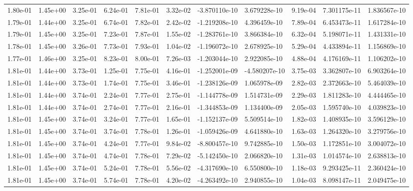 \begin{longtable}{| p{} | p{} |}
1.80e-01 & 1.45e+00 & 3.25e-01 & 6.24e-01 & 7.81e-01 & 3.32e-02 & -3.870110e-10 &  3.679228e-10 &  9.19e-04 &  7.301175e-11 &  1.836567e-10 \\
1.79e-01 & 1.44e+00 & 3.25e-01 & 6.74e-01 & 7.82e-01 & 2.42e-02 & -1.219208e-10 &  4.396459e-10 &  7.89e-04 &  6.453473e-11 &  1.617284e-10 \\
1.79e-01 & 1.45e+00 & 3.25e-01 & 7.23e-01 & 7.87e-01 & 1.55e-02 & -1.283761e-10 &  3.866384e-10 &  6.32e-04 &  5.198071e-11 &  1.431331e-10 \\
1.78e-01 & 1.45e+00 & 3.26e-01 & 7.73e-01 & 7.93e-01 & 1.04e-02 & -1.196072e-10 &  2.678925e-10 &  5.29e-04 &  4.433894e-11 &  1.156869e-10 \\
1.77e-01 & 1.46e+00 & 3.25e-01 & 8.23e-01 & 8.00e-01 & 7.26e-03 & -1.203044e-10 &  2.922085e-10 &  4.88e-04 &  4.176169e-11 &  1.106202e-10 \\
1.81e-01 & 1.44e+00 & 3.73e-01 & 1.25e-01 & 7.75e-01 & 4.16e-01 & -1.252001e-09 & -4.580207e-10 &  3.75e-03 &  3.362807e-10 &  6.903264e-10 \\
1.81e-01 & 1.44e+00 & 3.73e-01 & 1.74e-01 & 7.75e-01 & 3.46e-01 & -1.238126e-09 &  1.065978e-09 &  2.82e-03 &  2.372663e-10 &  5.464039e-10 \\
1.81e-01 & 1.44e+00 & 3.74e-01 & 2.24e-01 & 7.77e-01 & 2.75e-01 & -1.144778e-09 &  1.514731e-09 &  2.29e-03 &  1.811283e-10 &  4.444465e-10 \\
1.81e-01 & 1.44e+00 & 3.74e-01 & 2.74e-01 & 7.77e-01 & 2.16e-01 & -1.344853e-09 &  1.134400e-09 &  2.05e-03 &  1.595740e-10 &  4.039823e-10 \\
1.81e-01 & 1.45e+00 & 3.74e-01 & 3.24e-01 & 7.77e-01 & 1.65e-01 & -1.152137e-09 &  5.509514e-10 &  1.82e-03 &  1.408935e-10 &  3.596129e-10 \\
1.81e-01 & 1.45e+00 & 3.74e-01 & 3.74e-01 & 7.78e-01 & 1.26e-01 & -1.059426e-09 &  4.641880e-10 &  1.63e-03 &  1.264320e-10 &  3.279756e-10 \\
1.81e-01 & 1.45e+00 & 3.74e-01 & 4.24e-01 & 7.77e-01 & 9.84e-02 & -8.800457e-10 &  9.742885e-10 &  1.50e-03 &  1.172851e-10 &  3.004072e-10 \\
1.81e-01 & 1.45e+00 & 3.74e-01 & 4.74e-01 & 7.78e-01 & 7.29e-02 & -5.142450e-10 &  2.066820e-10 &  1.31e-03 &  1.014574e-10 &  2.638813e-10 \\
1.81e-01 & 1.45e+00 & 3.74e-01 & 5.24e-01 & 7.78e-01 & 5.56e-02 & -4.317690e-10 &  6.550800e-10 &  1.18e-03 &  9.293425e-11 &  2.360424e-10 \\
1.81e-01 & 1.45e+00 & 3.74e-01 & 5.74e-01 & 7.78e-01 & 4.20e-02 & -4.263492e-10 &  2.940855e-10 &  1.04e-03 &  8.098147e-11 &  2.049475e-10 \\

\end{longtable}
